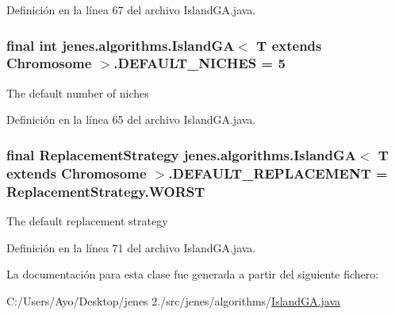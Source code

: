 Definición en la línea 67 del archivo Island\-G\-A.\-java.

\hypertarget{classjenes_1_1algorithms_1_1_island_g_a_3_01_t_01extends_01_chromosome_01_4_a37c9c99c1181aa1f194ad610bdb4d25f}{
\subsubsection[{D\-E\-F\-A\-U\-L\-T\-\_\-\-N\-I\-C\-H\-E\-S}]{\setlength{\rightskip}{0pt plus 5cm}final int jenes.\-algorithms.\-Island\-G\-A$<$ T extends Chromosome $>$.D\-E\-F\-A\-U\-L\-T\-\_\-\-N\-I\-C\-H\-E\-S = 5\hspace{0.3cm}{\ttfamily [static]}}}\label{classjenes_1_1algorithms_1_1_island_g_a_3_01_t_01extends_01_chromosome_01_4_a37c9c99c1181aa1f194ad610bdb4d25f}
The default number of niches 

Definición en la línea 65 del archivo Island\-G\-A.\-java.

\hypertarget{classjenes_1_1algorithms_1_1_island_g_a_3_01_t_01extends_01_chromosome_01_4_a1fc6944fd99215488896c76893d5f3d0}{
\subsubsection[{D\-E\-F\-A\-U\-L\-T\-\_\-\-R\-E\-P\-L\-A\-C\-E\-M\-E\-N\-T}]{\setlength{\rightskip}{0pt plus 5cm}final Replacement\-Strategy jenes.\-algorithms.\-Island\-G\-A$<$ T extends Chromosome $>$.D\-E\-F\-A\-U\-L\-T\-\_\-\-R\-E\-P\-L\-A\-C\-E\-M\-E\-N\-T = Replacement\-Strategy.\-W\-O\-R\-S\-T\hspace{0.3cm}{\ttfamily [static]}}}\label{classjenes_1_1algorithms_1_1_island_g_a_3_01_t_01extends_01_chromosome_01_4_a1fc6944fd99215488896c76893d5f3d0}
The default replacement strategy 

Definición en la línea 71 del archivo Island\-G\-A.\-java.



La documentación para esta clase fue generada a partir del siguiente fichero\-:\begin{DoxyCompactItemize}
\item 
C\-:/\-Users/\-Ayo/\-Desktop/jenes 2./src/jenes/algorithms/\hyperlink{_island_g_a_8java}{Island\-G\-A.\-java}\end{DoxyCompactItemize}
